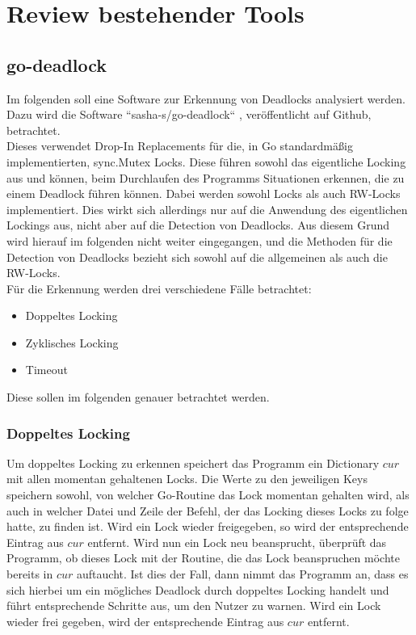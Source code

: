 \chapter{Review bestehender Tools}
\section{go-deadlock}\label{Chap::Review:go-deadlock}
Im folgenden soll eine Software zur Erkennung von Deadlocks analysiert werden.
Dazu wird die Software ``sasha-s/go-deadlock`` \cite{sasha-s}, veröffentlicht 
auf Github, betrachtet.\\
Dieses verwendet Drop-In Replacements für die, in Go standardmäßig 
implementierten, sync.Mutex Locks. Diese führen sowohl das eigentliche 
Locking aus und können, beim Durchlaufen des Programms Situationen erkennen, 
die zu einem Deadlock führen können. Dabei werden sowohl Locks
als auch RW-Locks implementiert. Dies wirkt sich allerdings nur auf
die Anwendung des eigentlichen Lockings aus, nicht aber auf die Detection von 
Deadlocks. Aus diesem Grund wird hierauf im folgenden nicht weiter eingegangen, 
und die Methoden für die Detection von Deadlocks bezieht sich sowohl auf die
allgemeinen als auch die RW-Locks.\\
Für die Erkennung werden drei verschiedene Fälle betrachtet:
\begin{itemize}
    \item Doppeltes Locking
    \item Zyklisches Locking
    \item Timeout
\end{itemize}
Diese sollen im folgenden genauer betrachtet werden.

\subsection{Doppeltes Locking}\label{Kap::Rev:Recursive}
Um doppeltes Locking zu erkennen speichert das Programm ein Dictionary $cur$ mit 
allen momentan gehaltenen 
Locks. Die Werte zu den jeweiligen Keys speichern sowohl, von welcher Go-Routine das 
Lock momentan gehalten wird, als auch in welcher Datei und Zeile der Befehl,
der das Locking dieses Locks zu folge hatte, zu finden ist. Wird ein Lock 
wieder freigegeben, so wird der entsprechende Eintrag aus $cur$ entfernt. 
Wird nun ein Lock neu beansprucht, überprüft 
das Programm, ob dieses Lock mit der Routine, die das Lock beanspruchen möchte 
bereits in $cur$ auftaucht. Ist dies der Fall, dann nimmt das
Programm an, dass es sich hierbei um ein mögliches Deadlock durch doppeltes Locking
handelt und führt 
entsprechende Schritte aus, um den Nutzer zu warnen. Wird ein Lock wieder frei
gegeben, wird der entsprechende Eintrag aus $cur$ entfernt.

